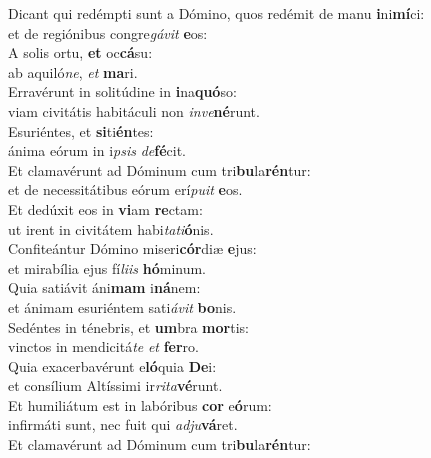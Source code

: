 \evenverse Dicant qui redémpti sunt a Dómino, quos redémit de manu \textbf{i}ni\textbf{mí}ci:~\*\\
\evenverse et de regiónibus congre\textit{gá}\textit{vit} \textbf{e}os:\\
\oddverse A solis ortu, \textbf{et} oc\textbf{cá}su:~\*\\
\oddverse ab aquiló\textit{ne}, \textit{et} \textbf{ma}ri.\\
\evenverse Erravérunt in solitúdine in \textbf{i}na\textbf{quó}so:~\*\\
\evenverse viam civitátis habitáculi non \textit{in}\textit{ve}\textbf{né}runt.\\
\oddverse Esuriéntes, et \textbf{si}ti\textbf{én}tes:~\*\\
\oddverse ánima eórum in i\textit{psis} \textit{de}\textbf{fé}cit.\\
\evenverse Et clamavérunt ad Dóminum cum tri\textbf{bu}la\textbf{rén}tur:~\*\\
\evenverse et de necessitátibus eórum erí\textit{pu}\textit{it} \textbf{e}os.\\
\oddverse Et dedúxit eos in \textbf{vi}am \textbf{re}ctam:~\*\\
\oddverse ut irent in civitátem habi\textit{ta}\textit{ti}\textbf{ó}nis.\\
\evenverse Confiteántur Dómino miseri\textbf{cór}diæ \textbf{e}jus:~\*\\
\evenverse et mirabília ejus fí\textit{li}\textit{is} \textbf{hó}minum.\\
\oddverse Quia satiávit áni\textbf{mam} i\textbf{ná}nem:~\*\\
\oddverse et ánimam esuriéntem sati\textit{á}\textit{vit} \textbf{bo}nis.\\
\evenverse Sedéntes in ténebris, et \textbf{um}bra \textbf{mor}tis:~\*\\
\evenverse vinctos in mendicitá\textit{te} \textit{et} \textbf{fer}ro.\\
\oddverse Quia exacerbavérunt e\textbf{ló}quia \textbf{De}i:~\*\\
\oddverse et consílium Altíssimi ir\textit{ri}\textit{ta}\textbf{vé}runt.\\
\evenverse Et humiliátum est in labóribus \textbf{cor} e\textbf{ó}rum:~\*\\
\evenverse infirmáti sunt, nec fuit qui \textit{ad}\textit{ju}\textbf{vá}ret.\\
\oddverse Et clamavérunt ad Dóminum cum tri\textbf{bu}la\textbf{rén}tur:~\*\\
